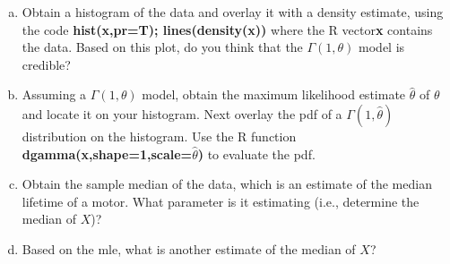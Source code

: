 \documentclass{book}
\theoremstyle{definition}
\begin{document}
\begin{enumerate}[(a)]
	\item Obtain a histogram of the data and overlay it with a density estimate, using
	the code \textbf{hist(x,pr=T); lines(density(x))} where the R vector\textbf{x} contains
	the data. Based on this plot, do you think that the $\Gamma(1, \theta)$ model is credible?
	
	\item Assuming a $\Gamma(1, \theta)$ model, obtain the maximum likelihood estimate $\hat{\theta}$ of $\theta$ and locate it on your histogram. Next overlay the pdf of a $\Gamma(1, \hat{\theta})$ distribution on the histogram. Use the R function \textbf{dgamma(x,shape=1,scale=$\hat{\theta}$)} to evaluate the pdf.
	
	\item Obtain the sample median of the data, which is an estimate of the median
	lifetime of a motor. What parameter is it estimating (i.e., determine the
	median of $X$)?
	
	\item Based on the mle, what is another estimate of the median of $X$?
\end{enumerate}
\end{document}
